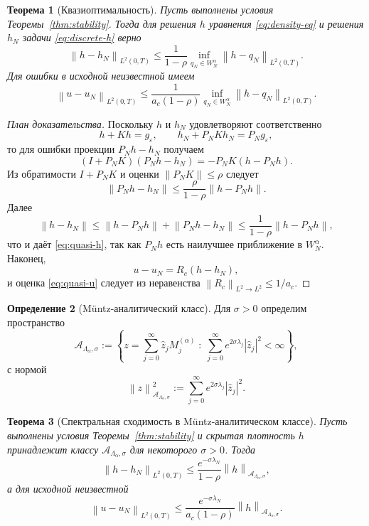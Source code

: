 \documentclass[12pt,a4paper]{article}
\newtheorem{theorem}{Теорема}[section]
\theoremstyle{definition}
\newtheorem{definition}[theorem]{Определение}
\newcommand{\eps}{\varepsilon}
\newcommand{\Rc}{R_c}
\newcommand{\norm}[1]{\left\lVert #1 \right\rVert}
\begin{document}
\begin{theorem}[Квазиоптимальность]
\label{thm:quasioptimal}
Пусть выполнены условия Теоремы~\ref{thm:stability}. Тогда для решения $h$ уравнения
\eqref{eq:density-eq} и решения $h_N$ задачи \eqref{eq:discrete-h} верно
\begin{equation}
\label{eq:quasi-h}
\norm{h-h_N}_{L^2(0,T)}
\le
\frac{1}{1-\rho}
\inf_{q_N\in W_N^\alpha}\norm{h-q_N}_{L^2(0,T)}.
\end{equation}
Для ошибки в исходной неизвестной имеем
\begin{equation}
\label{eq:quasi-u}
\norm{u-u_N}_{L^2(0,T)}
\le
\frac{1}{a_c(1-\rho)}
\inf_{q_N\in W_N^\alpha}\norm{h-q_N}_{L^2(0,T)}.
\end{equation}
\end{theorem}

\begin{proof}[План доказательства]
Поскольку $h$ и $h_N$ удовлетворяют соответственно
\[
h+Kh=g_\eps,
\qquad
h_N+P_NKh_N=P_Ng_\eps,
\]
то для ошибки проекции $P_Nh-h_N$ получаем
\[
(I+P_NK)(P_Nh-h_N)=-P_NK(h-P_Nh).
\]
Из обратимости $I+P_NK$ и оценки $\norm{P_NK}\le \rho$ следует
\[
\norm{P_Nh-h_N}\le \frac{\rho}{1-\rho}\norm{h-P_Nh}.
\]
Далее
\[
\norm{h-h_N}\le \norm{h-P_Nh}+\norm{P_Nh-h_N}
\le \frac{1}{1-\rho}\norm{h-P_Nh},
\]
что и даёт \eqref{eq:quasi-h}, так как $P_Nh$ есть наилучшее приближение в $W_N^\alpha$.
Наконец,
\[
u-u_N=\Rc(h-h_N),
\]
и оценка \eqref{eq:quasi-u} следует из неравенства $\norm{\Rc}_{L^2\to L^2}\le 1/a_c$.
\end{proof}

\begin{definition}[M\"untz-аналитический класс]
\label{def:analytic-class}
Для $\sigma>0$ определим пространство
\[
\mathcal{A}_{\Lambda_\alpha,\sigma}
:=
\left\{
z=\sum_{j=0}^\infty \widehat z_j M_j^{(\alpha)} \;:\;
\sum_{j=0}^\infty e^{2\sigma \lambda_j}|\widehat z_j|^2<\infty
\right\},
\]
с нормой
\[
\norm{z}_{\mathcal{A}_{\Lambda_\alpha,\sigma}}^2
:=
\sum_{j=0}^\infty e^{2\sigma \lambda_j}|\widehat z_j|^2.
\]
\end{definition}

\begin{theorem}[Спектральная сходимость в M\"untz-аналитическом классе]
\label{thm:spectral}
Пусть выполнены условия Теоремы~\ref{thm:stability} и скрытая плотность
$h$ принадлежит классу $\mathcal{A}_{\Lambda_\alpha,\sigma}$ для некоторого $\sigma>0$.
Тогда
\begin{equation}
\label{eq:spectral-h}
\norm{h-h_N}_{L^2(0,T)}
\le
\frac{e^{-\sigma \lambda_N}}{1-\rho}
\norm{h}_{\mathcal{A}_{\Lambda_\alpha,\sigma}},
\end{equation}
а для исходной неизвестной
\begin{equation}
\label{eq:spectral-u}
\norm{u-u_N}_{L^2(0,T)}
\le
\frac{e^{-\sigma \lambda_N}}{a_c(1-\rho)}
\norm{h}_{\mathcal{A}_{\Lambda_\alpha,\sigma}}.
\end{equation}
\end{theorem}
\end{document}
